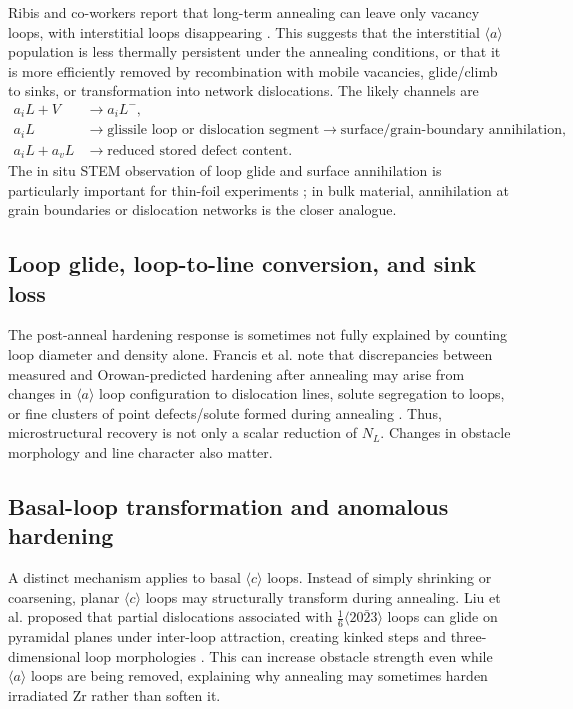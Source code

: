 \documentclass[11pt]{article}
\begin{document}
Ribis and co-workers report that long-term annealing can leave only vacancy loops, with interstitial loops disappearing \citep{Ribis2008,Ribis2010}.  This suggests that the interstitial $\langle a\rangle$ population is less thermally persistent under the annealing conditions, or that it is more efficiently removed by recombination with mobile vacancies, glide/climb to sinks, or transformation into network dislocations.  The likely channels are
\begin{align}
  a_iL + V &\rightarrow a_iL^- ,\\
  a_iL &\rightarrow \text{glissile loop or dislocation segment} \rightarrow \text{surface/grain-boundary annihilation},\\
  a_iL + a_vL &\rightarrow \text{reduced stored defect content}.
\end{align}
The in situ STEM observation of loop glide and surface annihilation is particularly important for thin-foil experiments \citep{Topping2018}; in bulk material, annihilation at grain boundaries or dislocation networks is the closer analogue.

\subsection{Loop glide, loop-to-line conversion, and sink loss}

The post-anneal hardening response is sometimes not fully explained by counting loop diameter and density alone.  Francis et al. note that discrepancies between measured and Orowan-predicted hardening after annealing may arise from changes in $\langle a\rangle$ loop configuration to dislocation lines, solute segregation to loops, or fine clusters of point defects/solute formed during annealing \citep{Francis2015}.  Thus, microstructural recovery is not only a scalar reduction of $N_L$.  Changes in obstacle morphology and line character also matter.

\subsection{Basal-loop transformation and anomalous hardening}

A distinct mechanism applies to basal $\langle c\rangle$ loops.  Instead of simply shrinking or coarsening, planar $\langle c\rangle$ loops may structurally transform during annealing.  Liu et al. proposed that partial dislocations associated with $\frac{1}{6}\langle20\bar{2}3\rangle$ loops can glide on pyramidal planes under inter-loop attraction, creating kinked steps and three-dimensional loop morphologies \citep{Liu2025}.  This can increase obstacle strength even while $\langle a\rangle$ loops are being removed, explaining why annealing may sometimes harden irradiated Zr rather than soften it.
\end{document}
